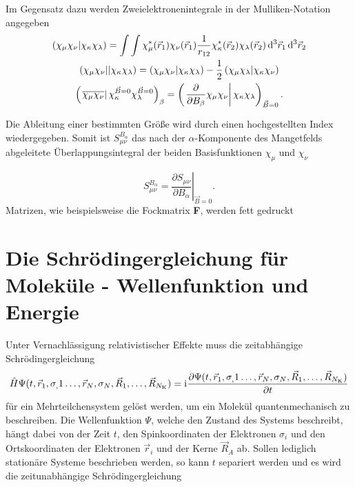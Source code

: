 Im Gegensatz dazu werden Zweielektronenintegrale in der Mulliken-Notation angegeben
\begin{gather*}
	\left(\chi_\mu\chi_\nu\vert\chi_\kappa\chi_\lambda\right)=\int\int\chi_\mu^*(\vec{r}_1)\chi_\nu(\vec{r}_1)\frac{1}{r_{12}}\chi_\kappa^*(\vec{r}_2)\chi_\lambda(\vec{r}_2)\mathop{}\!\mathrm{d^3} \vec{r}_1 \mathop{}\!\mathrm{d^3} \vec{r}_2\\
    \left(\chi_\mu\chi_\nu\vert\vert\chi_\kappa\chi_\lambda\right)=\left(\chi_\mu\chi_\nu\vert\chi_\kappa\chi_\lambda\right)-\frac{1}{2}\left(\chi_\mu\chi_\lambda\vert\chi_\kappa\chi_\nu\right)\\
    \left(\left.\overline{\chi_\mu\chi_\nu}\right\vert\chi_\kappa^{\vec{B}=0 }\chi_\lambda^{\vec{B}=0}\right)_\beta=\left(\left.\frac{\partial}{\partial B_\beta}\chi_\mu\chi_\nu\right|\chi_\kappa\chi_\lambda\right)_{\vec{B} = 0}.
\end{gather*}

Die Ableitung einer bestimmten Größe wird durch einen hochgestellten Index wiedergegeben. Somit ist $S^{B_\alpha}_{\mu\nu}$ das nach der $\alpha$-Komponente des Mangetfelds abgeleitete Überlappungsintegral der beiden Basisfunktionen $\chi_\mu$ und $\chi_\nu$

\begin{equation*}
  S^{B_\alpha}_{\mu\nu}=\left.\frac{\partial S_{\mu\nu}}{\partial B_\alpha}\right|_{\vec{B} = 0}.
\end{equation*} 
Matrizen, wie beispielsweise die Fockmatrix \textbf{F}, werden fett gedruckt
\section{Die Schrödingergleichung für Moleküle - Wellenfunktion und Energie}
Unter Vernachlässigung relativistischer Effekte muss die zeitabhängige Schrödingergleichung
\begin{equation}
  \hat{H}\Psi(t,\vec{r}_1,\sigma_,1\dotsc,\vec{r}_N,\sigma_N,\vec{R}_1,\dotsc,\vec{R}_{N_{\text{K}}})=\mathrm{i}\mkern1mu\frac{\partial\Psi(t,\vec{r}_1,\sigma_,1\dotsc,\vec{r}_N,\sigma_N,\vec{R}_1,\dotsc,\vec{R}_{N_{\text{K}}})}{\partial t}
\end{equation}
für ein Mehrteilchensystem gelöst werden, um ein Molekül quantenmechanisch zu beschreiben. Die Wellenfunktion $\Psi$, welche den Zustand des Systems beschreibt, hängt dabei von der Zeit $t$, den Spinkoordinaten der Elektronen $\sigma_i$ und den Ortskoordinaten der Elektronen $\vec{r}_i$ und der Kerne $\vec{R}_A$ ab. Sollen lediglich stationäre Systeme beschrieben werden, so kann $t$ separiert werden und es wird die zeitunabhängige Schrödingergleichung 

